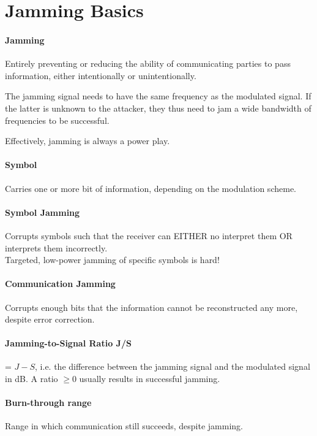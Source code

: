 \section{Jamming Basics}

\paragraph{Jamming}
Entirely preventing or reducing the ability of communicating parties to pass information, either intentionally or unintentionally.

The jamming signal needs to have the same frequency as the modulated signal.
If the latter is unknown to the attacker, they thus need to jam a wide bandwidth of frequencies to be successful.

Effectively, jamming is always a power play.

\paragraph{Symbol}
Carries one or more bit of information, depending on the modulation scheme.

\paragraph{Symbol Jamming}
Corrupts symbols such that the receiver can EITHER no interpret them OR interprets them incorrectly.\\
Targeted, low-power jamming of specific symbols is hard!

\paragraph{Communication Jamming}
Corrupts enough bits that the information cannot be reconstructed any more, despite error correction.

\paragraph{Jamming-to-Signal Ratio J/S} = $J -  S$, i.e. the difference between the jamming signal and the modulated signal in dB.
A ratio $\geq 0$ usually results in successful jamming.

\paragraph{Burn-through range}
Range in which communication still succeeds, despite jamming.


